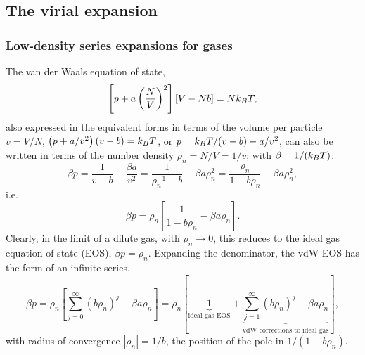 \subsection{The virial expansion}
\subsubsection*{Low-density series expansions for gases}

The van der Waals equation of state,
\begin{equation}
  \left[p + a\left(\frac{N}{V}\right)^2\right]\left[V-Nb\right] = Nk_{B} T,
\end{equation}
also expressed in the equivalent forms in terms of the volume per particle $v = V/N$,
$\left(p + a/v^2\right)(v-b) = k_{B} T$, or $p = k_{B} T/(v-b) - a/v^2$, can also be written in terms of the
number density $\rho_n = N/V = 1/v$; with $\beta = 1/(k_{B} T)$:
\begin{equation}
  \beta p = \frac{1}{v-b} - \frac{\beta a}{v^2} = \frac{1}{\rho_n^{-1}-b} - \beta a\rho_n^2
  = \frac{\rho_n}{1-b\rho_n} - \beta a\rho_n^2,
\end{equation}
i.e.
\begin{equation}
  \boxed{\beta p = \rho_n\left[\frac{1}{1-b\rho_n} - \beta a\rho_n\right]}.
\end{equation}
Clearly, in the limit of a dilute gas, with $\rho_n\to 0$, this reduces to the ideal gas equation of state (EOS),
$\beta p = \rho_n$. Expanding the denominator, the vdW EOS has the form of an infinite series,
\begin{equation}
  \beta p = \rho_n\left[\sum_{j=0}^\infty(b\rho_n)^j - \beta a\rho_n\right]
          = \rho_n\left[\underbrace{1}_{\text{ideal gas EOS}} + \underbrace{\sum_{j=1}^\infty(b\rho_n)^j - \beta a\rho_n}_{\text{vdW corrections to ideal gas}}\right],
\end{equation}
with radius of convergence $|\rho_n| = 1/b$, the position of the pole in $1/(1-b\rho_n)$.

